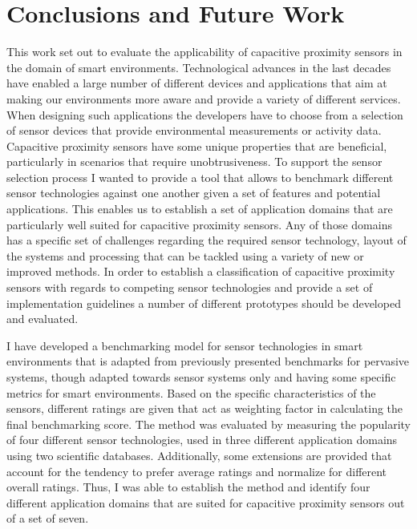 \chapter{Conclusions and Future Work}
\label{ch:conclusion}

This work set out to evaluate the applicability of capacitive proximity sensors in the domain of smart environments. Technological advances in the last decades have enabled a large number of different devices and applications that aim at making our environments more aware and provide a variety of different services. When designing such applications the developers have to choose from a selection of sensor devices that provide environmental measurements or activity data. Capacitive proximity sensors have some unique properties that are beneficial, particularly in scenarios that require unobtrusiveness. To support the sensor selection process I wanted to provide a tool that allows to benchmark different sensor technologies against one another given a set of features and potential applications. This enables us to establish a set of application domains that are particularly well suited for capacitive proximity sensors. Any of those domains has a specific set of challenges regarding the required sensor technology, layout of the systems and processing that can be tackled using a variety of new or improved methods. In order to establish a classification of capacitive proximity sensors with regards to competing sensor technologies and provide a set of implementation guidelines a number of different prototypes should be developed and evaluated.

I have developed a benchmarking model for sensor technologies in smart environments that is adapted from previously presented benchmarks for pervasive systems, though adapted towards sensor systems only and having some specific metrics for smart environments. Based on the specific characteristics of the sensors, different ratings are given that act as weighting factor in calculating the final benchmarking score. The method was evaluated by measuring the popularity of four different sensor technologies, used in three different application domains using two scientific databases. Additionally, some extensions are provided that account for the tendency to prefer average ratings and normalize for different overall ratings. Thus, I was able to establish the method and identify four different application domains that are suited for capacitive proximity sensors out of a set of seven. 


